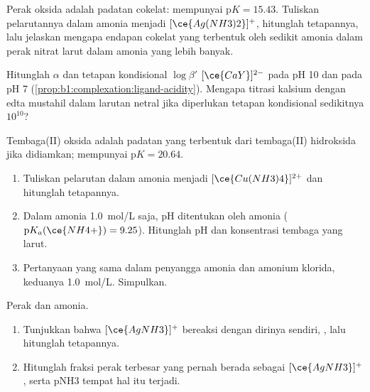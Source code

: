 \begin{exercise}[$\star\star$]\label{exo:b1:complexation:8}
Perak oksida  adalah padatan cokelat: 
mempunyai $\mathrm{p}K = 15.43$. Tuliskan pelarutannya dalam amonia
menjadi $[\ce{Ag(NH3)2}]^{+}$, hitunglah tetapannya, lalu jelaskan
mengapa endapan cokelat yang terbentuk oleh sedikit amonia dalam perak
nitrat larut dalam amonia yang lebih banyak.
\end{exercise}

\begin{exercise}[$\star\star$]\label{exo:b1:complexation:9}
Hitunglah $\alpha$ dan tetapan kondisional $\log\beta'$ $[\ce{CaY}]^{2-}$
pada pH 10 dan pada pH 7 (\cref{prop:b1:complexation:ligand-acidity}).
Mengapa titrasi kalsium dengan edta mustahil dalam larutan netral jika
diperlukan tetapan kondisional sedikitnya $10^{10}$?
\end{exercise}

\begin{exercise}[$\star\star\star$]\label{exo:b1:complexation:10}
Tembaga(II) oksida  adalah padatan yang terbentuk dari tembaga(II)
hidroksida jika didiamkan;  mempunyai
$\mathrm{p}K = 20.64$.
\begin{enumerate}
  \item Tuliskan pelarutan  dalam amonia menjadi
        $[\ce{Cu(NH3)4}]^{2+}$ dan hitunglah tetapannya.
  \item Dalam amonia \qty{1.0}{mol/L} saja, pH ditentukan oleh amonia
        ($\mathrm{p}K_a(\ce{NH4+}) = 9.25$). Hitunglah pH dan konsentrasi
        tembaga yang larut.
  \item Pertanyaan yang sama dalam penyangga amonia dan amonium klorida,
        keduanya \qty{1.0}{mol/L}. Simpulkan.
\end{enumerate}
\end{exercise}

\begin{exercise}[$\star\star\star$]\label{exo:b1:complexation:11}
Perak dan amonia.
\begin{enumerate}
  \item Tunjukkan bahwa $[\ce{AgNH3}]^{+}$ bereaksi dengan dirinya sendiri,
        , lalu hitunglah tetapannya.
  \item Hitunglah fraksi perak terbesar yang pernah berada sebagai
        $[\ce{AgNH3}]^{+}$, serta pNH3 tempat hal itu terjadi.
\end{enumerate}
\end{exercise}

